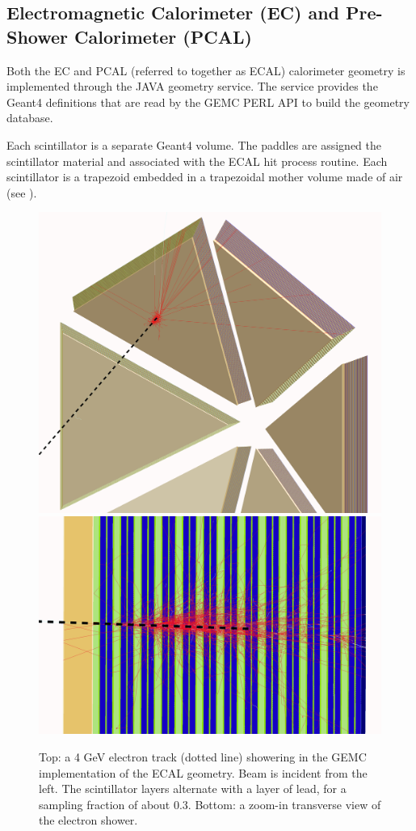 \subsection{Electromagnetic Calorimeter (EC) and Pre-Shower Calorimeter (PCAL)}

Both the EC and PCAL (referred to together as ECAL) calorimeter geometry is implemented through the JAVA
geometry service. The service provides the Geant4 definitions that are read by the GEMC PERL API to build the
geometry database.

Each scintillator is a separate Geant4 volume. The paddles are assigned the scintillator material and associated with
the ECAL hit process routine. Each scintillator is a trapezoid embedded in a trapezoidal mother volume made of air
(see ).

\begin{figure}
	\centering
	\includegraphics[width=0.99\columnwidth,keepaspectratio]{img/ecGeometry.png}
	\includegraphics[width=0.99\columnwidth,keepaspectratio]{img/ecDetail.png}
	\caption{Top: a 4 GeV electron track (dotted line) showering in the GEMC implementation of the ECAL geometry.
        	 Beam is incident from the left.
             The scintillator layers alternate with a layer of lead, for a sampling fraction of about 0.3.
             Bottom: a zoom-in transverse view of the electron shower.}
	\label{fig:ecGeometry}
\end{figure}

